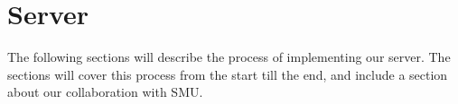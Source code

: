 \section{Server}
The following sections will describe the process of implementing our server. The sections will cover this process from the start till the end, and include a section about our collaboration with SMU.





